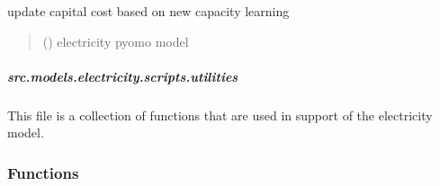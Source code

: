 \documentclass[letterpaper,10pt,english]{sphinxmanual}
\begin{document}

\begin{fulllineitems}
\label{\detokenize{src.models.electricity.scripts.runner:src.models.electricity.scripts.runner.update_cost}}
\pysigstartsignatures
\pysiglinewithargsret
{}
{}
{}
\pysigstopsignatures
\sphinxAtStartPar
update capital cost based on new capacity learning
\begin{quote}\begin{description}
\sphinxAtStartPar
{} ({\hyperref[\detokenize{src.models.electricity.scripts.electricity_model:src.models.electricity.scripts.electricity_model.PowerModel}]{}}) \textendash{} electricity pyomo model

\end{description}\end{quote}

\end{fulllineitems}


\sphinxstepscope


\subparagraph{src.models.electricity.scripts.utilities}
\label{\detokenize{src.models.electricity.scripts.utilities:module-src.models.electricity.scripts.utilities}}\label{\detokenize{src.models.electricity.scripts.utilities:src-models-electricity-scripts-utilities}}\label{\detokenize{src.models.electricity.scripts.utilities::doc}}
\sphinxAtStartPar
This file is a collection of functions that are used in support of the electricity model.
\subsubsection*{Functions}
\end{document}
